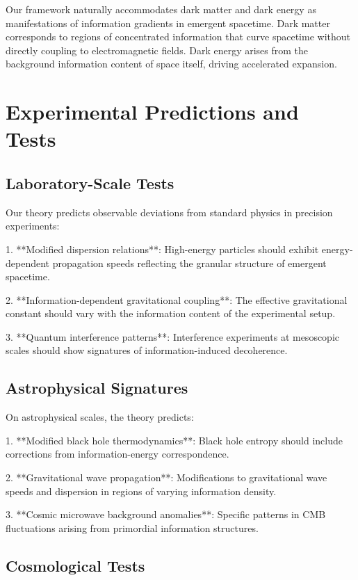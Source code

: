 \documentclass[11pt,a4paper]{article}
\begin{document}
Our framework naturally accommodates dark matter and dark energy as manifestations of information gradients in emergent spacetime. Dark matter corresponds to regions of concentrated information that curve spacetime without directly coupling to electromagnetic fields. Dark energy arises from the background information content of space itself, driving accelerated expansion.

\section{Experimental Predictions and Tests}

\subsection{Laboratory-Scale Tests}

Our theory predicts observable deviations from standard physics in precision experiments:

1. **Modified dispersion relations**: High-energy particles should exhibit energy-dependent propagation speeds reflecting the granular structure of emergent spacetime.

2. **Information-dependent gravitational coupling**: The effective gravitational constant should vary with the information content of the experimental setup.

3. **Quantum interference patterns**: Interference experiments at mesoscopic scales should show signatures of information-induced decoherence.

\subsection{Astrophysical Signatures}

On astrophysical scales, the theory predicts:

1. **Modified black hole thermodynamics**: Black hole entropy should include corrections from information-energy correspondence.

2. **Gravitational wave propagation**: Modifications to gravitational wave speeds and dispersion in regions of varying information density.

3. **Cosmic microwave background anomalies**: Specific patterns in CMB fluctuations arising from primordial information structures.

\subsection{Cosmological Tests}
\end{document}
